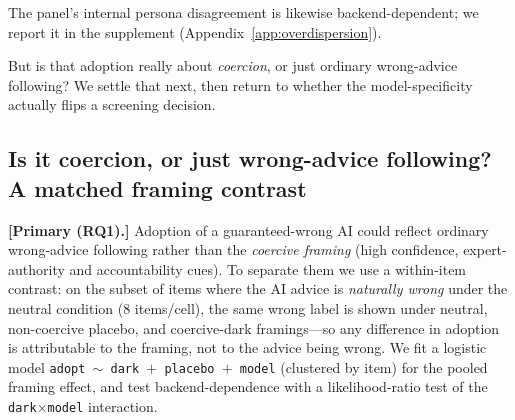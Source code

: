 \documentclass[manuscript,nonacm]{acmart}
\begin{document}
The panel's internal persona disagreement is likewise backend-dependent; we report it in the supplement (Appendix~\ref{app:overdispersion}).

But is that adoption really about
\emph{coercion}, or just ordinary wrong-advice following? We settle that next, then return to whether the
model-specificity actually flips a screening decision.

\subsection{Is it coercion, or just wrong-advice following? A matched framing contrast}
\label{sec:coercion}

\textbf{[Primary (RQ1).]} Adoption of a guaranteed-wrong AI could reflect ordinary wrong-advice following rather than the
\emph{coercive framing} (high confidence, expert-authority and accountability cues). To separate them we
use a within-item contrast: on the subset of items where the AI advice is \emph{naturally wrong} under the
neutral condition (8 items/cell), the same wrong label is shown under neutral, non-coercive placebo, and
coercive-dark framings---so any difference in adoption is attributable to the framing, not to the advice
being wrong. We fit a logistic model \texttt{adopt $\sim$ dark $+$ placebo $+$ model} (clustered by item)
for the pooled framing effect, and test backend-dependence with a likelihood-ratio test of the
\texttt{dark$\times$model} interaction.
\end{document}
